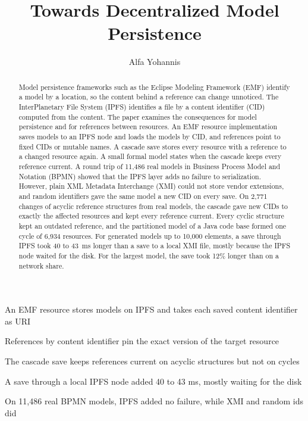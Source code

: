 \documentclass[5p,times,twocolumn]{elsarticle}
\theoremstyle{definition}
\theoremstyle{plain}
\begin{document}
\begin{frontmatter}

\title{Towards Decentralized Model Persistence}

\author{Alfa Yohannis}


\begin{abstract}
Model persistence frameworks such as the Eclipse Modeling Framework (EMF) identify a model by a location, so the content behind a reference can change unnoticed. The InterPlanetary File System (IPFS) identifies a file by a content identifier (CID) computed from the content. The paper examines the consequences for model persistence and for references between resources. An EMF resource implementation saves models to an IPFS node and loads the models by CID, and references point to fixed CIDs or mutable names. A cascade save stores every resource with a reference to a changed resource again. A small formal model states when the cascade keeps every reference current. A round trip of 11,486 real models in Business Process Model and Notation (BPMN) showed that the IPFS layer adds no failure to serialization. However, plain XML Metadata Interchange (XMI) could not store vendor extensions, and random identifiers gave the same model a new CID on every save. On 2,771 changes of acyclic reference structures from real models, the cascade gave new CIDs to exactly the affected resources and kept every reference current. Every cyclic structure kept an outdated reference, and the partitioned model of a Java code base formed one cycle of 6,934 resources. For generated models up to 10,000 elements, a save through IPFS took 40 to 43~ms longer than a save to a local XMI file, mostly because the IPFS node waited for the disk. For the largest model, the save took 12\% longer than on a network share.
\end{abstract}

\begin{highlights}
\item An EMF resource stores models on IPFS and takes each saved content identifier as URI
\item References by content identifier pin the exact version of the target resource
\item The cascade save keeps references current on acyclic structures but not on cycles
\item A save through a local IPFS node added 40 to 43 ms, mostly waiting for the disk
\item On 11,486 real BPMN models, IPFS added no failure, while XMI and random ids did
\end{highlights}


\end{frontmatter}
\end{document}
